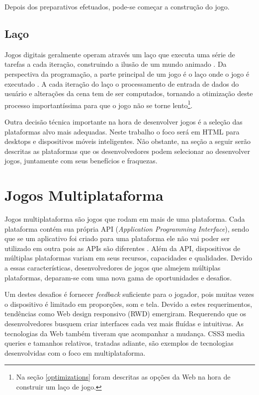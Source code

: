Depois dos preparativos efetuados, pode-se começar a construção
do jogo.

\subsection{Laço}

Jogos digitais geralmente operam através um laço que executa uma
série de tarefas a cada iteração, construindo a ilusão de um mundo
animado \autocite[p. 31]{gwt}. Da perspectiva da programação, a parte
principal de um jogo é o laço onde o jogo é executado \autocite[p.
17]{crossPlatformMobileGameDevelopment}. A cada iteração do laço
o processamento de entrada de dados do usuário e alterações da
cena tem de ser computados, tornando a otimização deste processo
importantíssima para que o jogo não se torne lento\footnote{Na seção
\ref{optimizations} foram descritas as opções da Web
na hora de construir um laço de jogo.}.

Outra decisão técnica importante na hora de desenvolver jogos é a
seleção das plataformas alvo mais adequadas. Neste trabalho o foco será
em  HTML para desktops e dispositivos móveis inteligentes. Não obstante,
na seção a seguir serão descritas as plataformas que os
desenvolvedores podem selecionar ao desenvolver jogos, juntamente com
seus benefícios e fraquezas.

\section{Jogos Multiplataforma}

Jogos multiplataforma são jogos que rodam em mais de uma plataforma.
Cada plataforma contém sua própria API (\textit{Application
Programming Interface}), sendo que se um aplicativo foi criado para
uma plataforma ele não vai poder ser utilizado em outra pois as
APIs são diferentes \autocite{crossPlatformMobileGameDevelopment}.
Além da API, dispositivos de múltiplas plataformas variam em seus
recursos, capacidades e qualidades. Devido a essas características,
desenvolvedores de jogos que almejem múltiplas plataformas, deparam-se
com uma nova gama de oportunidades e desafios.

Um destes desafios é fornecer \textit{feedback} suficiente para o
jogador, pois muitas vezes o dispositivo é limitado em proporções,
som e tela. Devido a estes requerimentos, tendências como Web design
responsivo (RWD) emergiram. Requerendo que os desenvolvedores busquem
criar interfaces cada vez mais fluídas e intuitivas. As tecnologias
da Web também tiveram que acompanhar a mudança. CSS3 media queries
e tamanhos relativos, tratadas adiante, são exemplos de tecnologias
desenvolvidas com o foco em multiplataforma.

